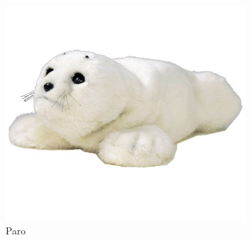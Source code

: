 \begin{figure}[h]
\begin{subfigure}[h]{0.2\textwidth}
                \label{fig:pearl}
        \end{subfigure}
        \begin{subfigure}[h]{0.45\textwidth}
                \includegraphics[width=\textwidth]{./img/3/paro}
                \caption{Paro}
                \label{fig:paro}
        \end{subfigure}
        \begin{subfigure}[h]{0.2\textwidth}

\end{subfigure}
\end{figure}
